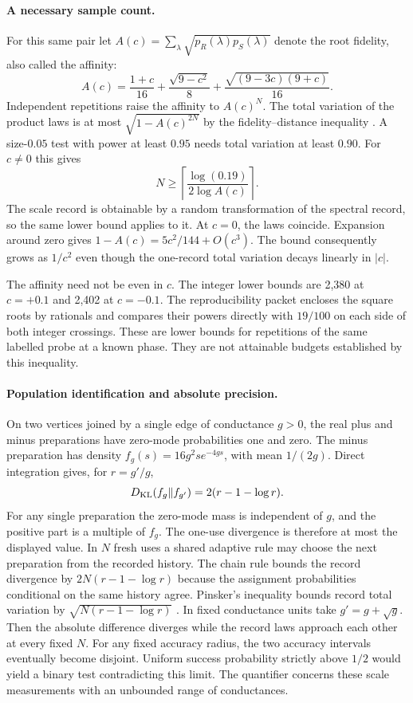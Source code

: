 \documentclass[11pt,letterpaper]{article}
\begin{document}
\paragraph{A necessary sample count.}
For this same pair let $A(c)=\sum_\lambda\sqrt{p_R(\lambda)p_S(\lambda)}$ denote the root fidelity, also called the affinity:
\[
 A(c)=\frac{1+c}{16}+\frac{\sqrt{9-c^2}}8
       +\frac{\sqrt{(9-3c)(9+c)}}{16}.
\]
Independent repetitions raise the affinity to $A(c)^N$. The total variation of the product laws is at most $\sqrt{1-A(c)^{2N}}$ by the fidelity--distance inequality \cite[Theorem~3.33]{watrous}. A size-$0.05$ test with power at least $0.95$ needs total variation at least $0.90$. For $c\ne0$ this gives
\[
 N\ge\left\lceil\frac{\log(0.19)}{2\log A(c)}\right\rceil.
\]
The scale record is obtainable by a random transformation of the spectral record, so the same lower bound applies to it. At $c=0$, the laws coincide. Expansion around zero gives $1-A(c)=5c^2/144+O(c^3)$. The bound consequently grows as $1/c^2$ even though the one-record total variation decays linearly in $|c|$.

The affinity need not be even in $c$. The integer lower bounds are 2,380 at $c=+0.1$ and 2,402 at $c=-0.1$. The reproducibility packet encloses the square roots by rationals and compares their powers directly with $19/100$ on each side of both integer crossings. These are lower bounds for repetitions of the same labelled probe at a known phase. They are not attainable budgets established by this inequality.

\paragraph{Population identification and absolute precision.}
On two vertices joined by a single edge of conductance $g>0$, the real plus and minus preparations have zero-mode probabilities one and zero. The minus preparation has density $f_g(s)=16g^2s e^{-4gs}$, with mean $1/(2g)$. Direct integration gives, for $r=g'/g$,
\[
 D_{\rm KL}(f_g\Vert f_{g'})=2(r-1-\log r).
\]
For any single preparation the zero-mode mass is independent of $g$, and the positive part is a multiple of $f_g$. The one-use divergence is therefore at most the displayed value. In $N$ fresh uses a shared adaptive rule may choose the next preparation from the recorded history. The chain rule bounds the record divergence by $2N(r-1-\log r)$ because the assignment probabilities conditional on the same history agree. Pinsker's inequality bounds record total variation by $\sqrt{N(r-1-\log r)}$ \cite{poly}. In fixed conductance units take $g'=g+\sqrt g$. Then the absolute difference diverges while the record laws approach each other at every fixed $N$. For any fixed accuracy radius, the two accuracy intervals eventually become disjoint. Uniform success probability strictly above $1/2$ would yield a binary test contradicting this limit. The quantifier concerns these scale measurements with an unbounded range of conductances.
\end{document}
